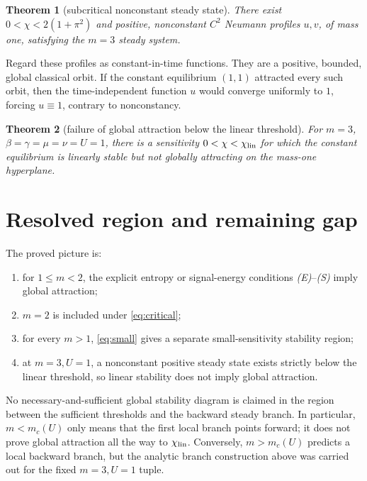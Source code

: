 \documentclass[11pt]{article}
\newtheorem{theorem}{Theorem}
\begin{document}
\begin{theorem}[subcritical nonconstant steady state]
There exist \(0<\chi<2(1+\pi^2)\) and positive, nonconstant \(C^2\)
Neumann profiles \(u,v\), of mass one, satisfying the \(m=3\) steady system.
\end{theorem}

Regard these profiles as constant-in-time functions.  They are a positive,
bounded, global classical orbit.  If the constant equilibrium \((1,1)\)
attracted every such orbit, then the time-independent function \(u\) would
converge uniformly to \(1\), forcing \(u\equiv1\), contrary to
nonconstancy.

\begin{theorem}[failure of global attraction below the linear threshold]
For \(m=3\), \(\beta=\gamma=\mu=\nu=U=1\), there is a sensitivity
\(0<\chi<\chi_{\rm lin}\) for which the constant equilibrium is linearly
stable but not globally attracting on the mass-one hyperplane.
\end{theorem}

\section{Resolved region and remaining gap}

The proved picture is:
\begin{enumerate}[leftmargin=2em]
\item for \(1\le m<2\), the explicit entropy or signal-energy conditions
  \emph{(E)}--\emph{(S)} imply global attraction;
\item \(m=2\) is included under \eqref{eq:critical};
\item for every \(m>1\), \eqref{eq:small} gives a separate
  small-sensitivity stability region;
\item at \(m=3,U=1\), a nonconstant positive steady state exists strictly
  below the linear threshold, so linear stability does not imply global
  attraction.
\end{enumerate}

No necessary-and-sufficient global stability diagram is claimed in the
region between the sufficient thresholds and the backward steady branch.
In particular, \(m<m_c(U)\) only means that the first local branch points
forward; it does not prove global attraction all the way to
\(\chi_{\rm lin}\).  Conversely, \(m>m_c(U)\) predicts a local backward
branch, but the analytic branch construction above was carried out for the
fixed \(m=3,U=1\) tuple.
\end{document}
